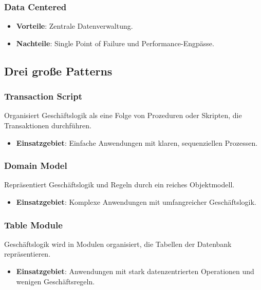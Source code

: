 \subsubsection{Data Centered}

\begin{itemize}
    \item \textbf{Vorteile}: Zentrale Datenverwaltung.
    \item \textbf{Nachteile}: Single Point of Failure und Performance-Engpässe.
\end{itemize}

\subsection{Drei große Patterns}

\subsubsection{Transaction Script}

Organisiert Geschäftslogik als eine Folge von Prozeduren oder Skripten, die Transaktionen durchführen.

\begin{itemize}
    \item \textbf{Einsatzgebiet}: Einfache Anwendungen mit klaren, sequenziellen Prozessen.
\end{itemize}

\subsubsection{Domain Model}

Repräsentiert Geschäftslogik und Regeln durch ein reiches Objektmodell.

\begin{itemize}
    \item \textbf{Einsatzgebiet}: Komplexe Anwendungen mit umfangreicher Geschäftslogik.
\end{itemize}

\subsubsection{Table Module}

Geschäftslogik wird in Modulen organisiert, die Tabellen der Datenbank repräsentieren.

\begin{itemize}
    \item \textbf{Einsatzgebiet}: Anwendungen mit stark datenzentrierten Operationen und wenigen Geschäftsregeln.
\end{itemize}

